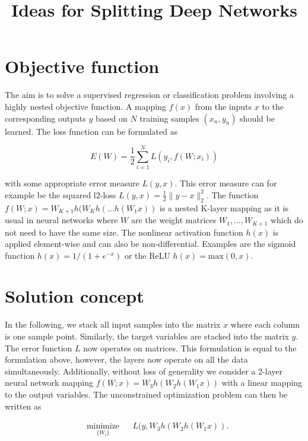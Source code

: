 \documentclass[english,11pt,a4paper]{article}
\title{Ideas for Splitting Deep Networks}
\author{}
\begin{document}
\maketitle

\section{Objective function}

The aim is to solve a supervised regression or classification problem involving a highly nested objective function. A mapping $f(x)$ from the inputs $x$ to the corresponding outputs $y$ based on $N$ training samples $(x_n, y_n)$ should be learned. The loss function can be formulated as

\begin{equation}
E(W) = \frac{1}{2} \sum_{i=1}^{N} L(y_i, f(W;x_i))
\end{equation}

with some appropriate error measure $L(y,x)$. This error measure can for example be the squared l2-loss $L(y,x) = \frac{1}{2} \| y - x \|^2_2$. The function $f(W;x) = W_{K+1}h(W_Kh(\dots h(W_1x))$ is a nested K-layer mapping as it is usual in neural networks where $W$ are the weight matrices $W_1,\dots,W_{K+1}$ which do not need to have the same size. The nonlinear activation function $h(x)$ is applied element-wise and can also be non-differential. Examples are the sigmoid function $h(x) = 1/(1 + e^{-x})$ or the ReLU $h(x) = \mathrm{max}(0, x)$.

\section{Solution concept}

In the following, we stack all input samples into the matrix $x$ where each column is one sample point. Similarly, the target variables are stacked into the matrix $y$. The error function $L$ now operates on matrices. This formulation is equal to the formulation above, however, the layers now operate on all the data simultaneously. Additionally, without loss of generality we consider a 2-layer neural network mapping $f(W;x) = W_3h(W_2h(W_1x))$ with a linear mapping to the output variables. The unconstrained optimization problem can then be written as

\begin{equation}
	\begin{aligned}
		& \underset{\{W_i\}}{\text{minimize}}
		& & L(y,W_3h(W_2h(W_1x)).
	\end{aligned}
\end{equation}
\end{document}
